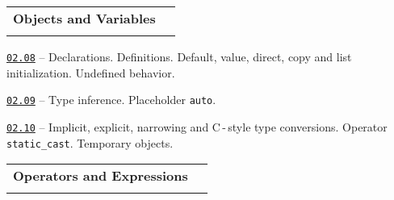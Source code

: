 \documentclass[a4paper,12pt]{article}
\renewenvironment{itemize}
{
    \begin{list}{\labelitemi}
    {
      \setlength{\topsep}{0pt}
      \setlength{\partopsep}{0pt}
      \setlength{\parskip}{0pt}
      \setlength{\itemsep}{0pt}
      \setlength{\parsep}{0pt}
      \setlength{\leftmargin}{14.5pt}
    }
}{\end{list}}
\begin{document}
\bigskip\medskip

\begin{tabular}{!{\vrule width 1pt}L{4.3cm}!{\vrule width 1pt}L{14.7cm}!{\vrule width 0pt}} 


\textbf{Objects and Variables} & \\


\end{tabular}

\medskip\smallskip

\begin{itemize}

    \item \href{https://github.com/i-s-m-mipt/Education/blob/master/projects/examples/source/02.08.cpp}{\texttt{02.08}} -- Declarations. Definitions. Default, value, direct, copy and list initialization. Undefined behavior.

    \smallskip

    \item \href{https://github.com/i-s-m-mipt/Education/blob/master/projects/examples/source/02.09.cpp}{\texttt{02.09}} -- Type inference. Placeholder \lstinline{auto}.

    \smallskip

    \item \href{https://github.com/i-s-m-mipt/Education/blob/master/projects/examples/source/02.10.cpp}{\texttt{02.10}} -- Implicit, explicit, narrowing and C\,-\,style type conversions. Operator \lstinline{static_cast}. Temporary objects.

\end{itemize}

\bigskip\medskip

\begin{tabular}{!{\vrule width 1pt}L{5.2cm}!{\vrule width 1pt}L{13.8cm}!{\vrule width 0pt}} 


\textbf{Operators and Expressions} & \\


\end{tabular}

\medskip\smallskip
\end{document}
